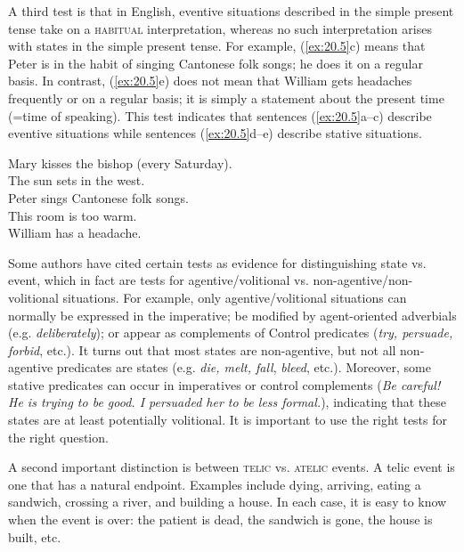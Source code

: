 \ea \label{ex:20.4}
                       \z
\z


A third test is that in English, eventive situations described in the simple present tense take on a \textsc{habitual} interpretation, whereas no such interpretation arises with states in the simple present tense. For example, (\ref{ex:20.5}c) means that Peter is in the habit of singing {Cantonese} folk songs; he does it on a regular basis. In contrast, (\ref{ex:20.5}e) does not mean that William gets headaches frequently or on a regular basis; it is simply a statement about the present time (=time of speaking). This test indicates that sentences (\ref{ex:20.5}a--c) describe eventive situations while sentences (\ref{ex:20.5}d--e) describe stative situations.


\ea \label{ex:20.5}
\ea  Mary kisses the bishop (every Saturday).\\
\ex The sun sets in the west.\\
\ex Peter sings {Cantonese} folk songs.\\
\ex This room is too warm.\\
\ex William has a headache.
                       \z
\z


Some authors have cited certain tests as evidence for distinguishing state vs. event, which in fact are tests for agentive/volitional vs. non-agentive/non-voli\-tion\-al situations. For example, only agentive/volitional situations can normally be expressed in the imperative; be modified by agent-oriented adverbials (e.g. \textit{deliberately}); or appear as complements of Control predicates (\textit{try, persuade, forbid}, etc.). It turns out that most states are non-agentive, but not all non-agentive predicates are states (e.g. \textit{die, melt, fall}, \textit{bleed}, etc.). Moreover, some stative predicates can occur in imperatives or control complements (\textit{Be careful! He is trying to be good. I persuaded her to be less formal.}), indicating that these states are at least potentially volitional. It is important to use the right tests for the right question.



A second important distinction is between \textsc{telic} vs. \textsc{atelic} events. A telic event is one that has a natural endpoint. Examples include dying, arriving, eating a sandwich, crossing a river, and building a house. In each case, it is easy to know when the event is over: the patient is dead, the sandwich is gone, the house is built, etc.




